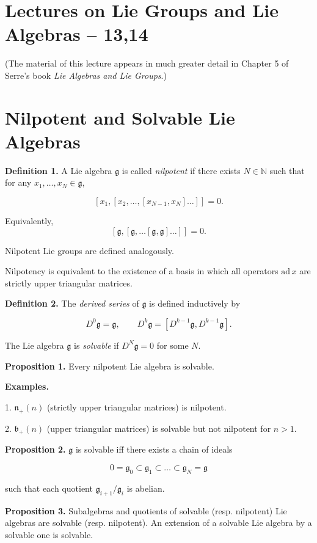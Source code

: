 \section*{Lectures on Lie Groups and Lie Algebras – 13,14}

(The material of this lecture appears in much greater detail in
Chapter 5 of Serre’s book \emph{Lie Algebras and Lie Groups}.)

\section*{Nilpotent and Solvable Lie Algebras}

\textbf{Definition 1.}
A Lie algebra $\mathfrak g$ is called \emph{nilpotent} if there exists
$N \in \mathbb{N}$ such that for any $x_1,\dots,x_N \in \mathfrak g$,

\[
[x_1,[x_2,\dots,[x_{N-1},x_N]\dots]]=0.
\]

Equivalently,
\[
[\mathfrak g,[\mathfrak g,\dots[\mathfrak g,\mathfrak g]\dots]]=0.
\]

Nilpotent Lie groups are defined analogously.

Nilpotency is equivalent to the existence of a basis in which
all operators $\mathrm{ad}\,x$ are strictly upper triangular matrices.

\textbf{Definition 2.}
The \emph{derived series} of $\mathfrak g$ is defined inductively by

\[
D^0\mathfrak g=\mathfrak g,
\qquad
D^k\mathfrak g=[D^{k-1}\mathfrak g,D^{k-1}\mathfrak g].
\]

The Lie algebra $\mathfrak g$ is \emph{solvable} if
$D^N\mathfrak g=0$ for some $N$.

\textbf{Proposition 1.}
Every nilpotent Lie algebra is solvable.

\textbf{Examples.}

1. $\mathfrak n_+(n)$ (strictly upper triangular matrices) is nilpotent.

2. $\mathfrak b_+(n)$ (upper triangular matrices) is solvable but not
nilpotent for $n>1$.

\textbf{Proposition 2.}
$\mathfrak g$ is solvable iff there exists a chain of ideals

\[
0=\mathfrak g_0\subset\mathfrak g_1\subset\dots\subset\mathfrak g_N=\mathfrak g
\]

such that each quotient $\mathfrak g_{i+1}/\mathfrak g_i$ is abelian.

\textbf{Proposition 3.}
Subalgebras and quotients of solvable (resp. nilpotent) Lie algebras
are solvable (resp. nilpotent).
An extension of a solvable Lie algebra by a solvable one is solvable.

